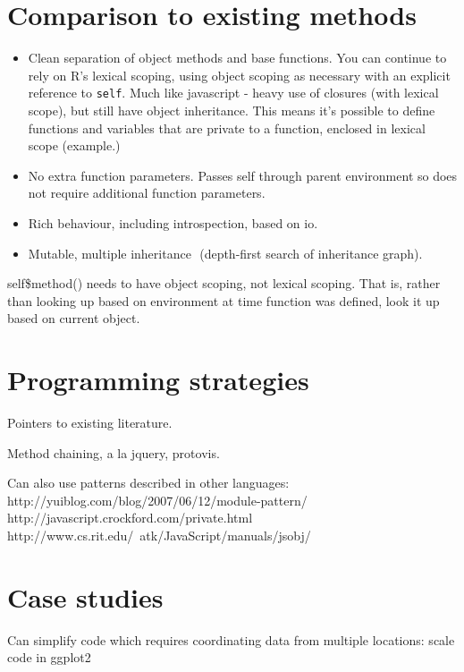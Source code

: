 \documentclass[oneside]{article}
\begin{document}
\section{Comparison to existing methods}
\label{sec:existing}

\begin{itemize}
  \item Clean separation of object methods and base functions.  You can continue to rely on R's lexical scoping, using object scoping as necessary with an explicit reference to {\tt self}.  Much like javascript - heavy use of closures (with lexical scope), but still have object inheritance.  This means it's possible to define functions and variables that are private to a function, enclosed in lexical scope (example.)

  \item No extra function parameters.  Passes self through parent environment so does not require additional function parameters. 

  \item Rich behaviour, including introspection, based on io.

  \item Mutable, multiple inheritance  (depth-first search of inheritance graph).
\end{itemize}

self\$method() needs to have object scoping, not lexical scoping.
That is, rather than looking up based on environment at time function was defined, look it up based on current object.

\section{Programming strategies}
\label{sec:strategies}

Pointers to existing literature.

Method chaining, a la jquery, protovis.


Can also use patterns described in other languages:
http://yuiblog.com/blog/2007/06/12/module-pattern/
http://javascript.crockford.com/private.html
http://www.cs.rit.edu/~atk/JavaScript/manuals/jsobj/

\section{Case studies}
\label{sec:case_studies}

Can simplify code which requires coordinating data from multiple locations: scale code in ggplot2
\end{document}
